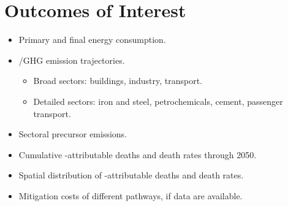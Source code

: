 
\section{Outcomes of Interest}\label{sec:outcomes}

\begin{itemize}
  \item Primary and final energy consumption.
  \item \COtwo{}/GHG emission trajectories.
        \begin{itemize}
          \item Broad sectors: buildings, industry, transport.
          \item Detailed sectors: iron and steel, petrochemicals, cement,
                passenger transport.
        \end{itemize}
  \item Sectoral precursor emissions.
  \item Cumulative \PM-attributable deaths and death rates through 2050.
  \item Spatial distribution of \PM-attributable deaths and death rates.
  \item Mitigation costs of different pathways, if data are available.
\end{itemize}
